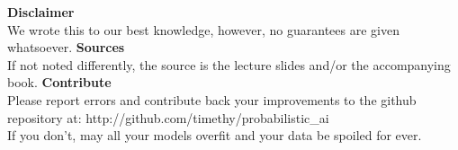 \documentclass[a4paper, 10pt]{scrartcl}
\begin{document}
\begin{centering}
\vspace*{1em}
\vfill
\textbf{Disclaimer} \\
We wrote this to our best knowledge, however, no guarantees are given whatsoever.
\vfill
\textbf{Sources} \\
If not noted differently, the source is the lecture slides and/or the accompanying book.
\vfill
\textbf{Contribute} \\
Please report errors and contribute back your improvements to the github repository at:
http://github.com/timethy/probabilistic\_ai \\
If you don't, may all your models overfit and your data be spoiled for ever.
\vfill
\end{centering}

\clearpage
\end{document}
